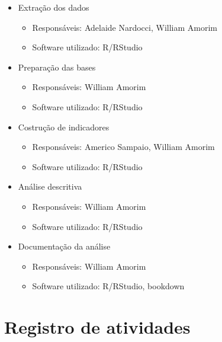 \documentclass[]{book}
\providecommand{\tightlist}{%
  \setlength{\itemsep}{0pt}\setlength{\parskip}{0pt}}
\begin{document}
\begin{itemize}
\tightlist
\item
  Extração dos dados

  \begin{itemize}
  \tightlist
  \item
    Responsáveis: Adelaide Nardocci, William Amorim
  \item
    Software utilizado: R/RStudio
  \end{itemize}
\item
  Preparação das bases

  \begin{itemize}
  \tightlist
  \item
    Responsáveis: William Amorim
  \item
    Software utilizado: R/RStudio
  \end{itemize}
\item
  Costrução de indicadores

  \begin{itemize}
  \tightlist
  \item
    Responsáveis: Americo Sampaio, William Amorim
  \item
    Software utilizado: R/RStudio
  \end{itemize}
\item
  Análise descritiva

  \begin{itemize}
  \tightlist
  \item
    Responsáveis: William Amorim
  \item
    Software utilizado: R/RStudio
  \end{itemize}
\item
  Documentação da análise

  \begin{itemize}
  \tightlist
  \item
    Responsáveis: William Amorim
  \item
    Software utilizado: R/RStudio, bookdown
  \end{itemize}
\end{itemize}

\hypertarget{registro-de-atividades}{%
\section*{Registro de atividades}\label{registro-de-atividades}}
\end{document}
